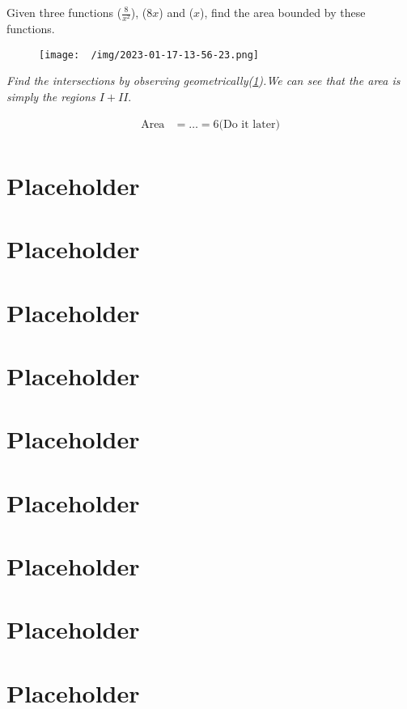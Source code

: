\documentclass[a4paper]{article}
\begin{document}
  Given three functions ($\frac{8 }{x^2}$), ($8x$) and ($x$), find the area bounded by these functions.
  \begin{figure}
    \begin{center}
      \texttt{[image: ~/img/2023-01-17-13-56-23.png]}
    \end{center}
    \caption{}
    \label{fig:intersect}
  \end{figure}
  
  \textit{Find the intersections by observing geometrically(\ref{fig:intersect}).We can see that the area is simply the regions $I + II$}.
  
  \begin{equation}
    \label{eq:6}
    \begin{split}
      \textrm{Area} &=\dots= 6 \textrm{(Do it later)}\\
    \end{split}
  \end{equation}
  \section{Placeholder} 
  \section{Placeholder} 
  \section{Placeholder} 
  \section{Placeholder} 
  \section{Placeholder} 
  \section{Placeholder} 
  \section{Placeholder} 
  \section{Placeholder} 
  \section{Placeholder} 
\end{document}
